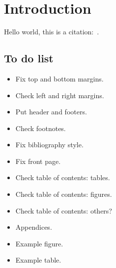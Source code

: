 \chapter{Introduction}
\label{chap:introduction}

Hello world, this is a citation:~\cite{Guyton:1956:TextbookPhysiology}.

\section{To do list}
\begin{itemize}
\item Fix top and bottom margins.
\item Check left and right margins.
\item Put header and footers.
\item Check footnotes.
\item Fix bibliography style.
\item Fix front page.
\item Check table of contents: tables.
\item Check table of contents: figures.
\item Check table of contents: others?
\item Appendices.
\item Example figure.
\item Example table.
\end{itemize}


\printbibliography[heading=subbibliography]

